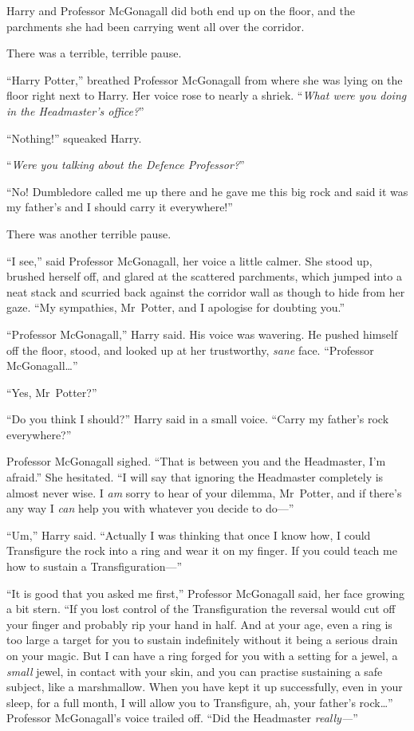 Harry and Professor McGonagall did both end up on the floor, and the parchments she had been carrying went all over the corridor.

There was a terrible, terrible pause.

“Harry Potter,” breathed Professor McGonagall from where she was lying on the floor right next to Harry. Her voice rose to nearly a shriek. “\emph{What were you doing in the Headmaster’s office?}”

“Nothing!” squeaked Harry.

“\emph{Were you talking about the Defence Professor?}”

“No! Dumbledore called me up there and he gave me this big rock and said it was my father’s and I should carry it everywhere!”

There was another terrible pause.

“I see,” said Professor McGonagall, her voice a little calmer. She stood up, brushed herself off, and glared at the scattered parchments, which jumped into a neat stack and scurried back against the corridor wall as though to hide from her gaze.
“My sympathies, Mr~Potter, and I apologise for doubting you.”

“Professor McGonagall,” Harry said. His voice was wavering. He pushed himself off the floor, stood, and looked up at her trustworthy, \emph{sane} face.
“Professor McGonagall…”

“Yes, Mr~Potter?”

“Do you think I should?” Harry said in a small voice.
“Carry my father’s rock everywhere?”

Professor McGonagall sighed.
“That is between you and the Headmaster, I’m afraid.” She hesitated.
“I will say that ignoring the Headmaster completely is almost never wise. I \emph{am} sorry to hear of your dilemma, Mr~Potter, and if there’s any way I \emph{can} help you with whatever you decide to do—”

“Um,” Harry said.
“Actually I was thinking that once I know how, I could Transfigure the rock into a ring and wear it on my finger. If you could teach me how to sustain a Transfiguration—”

“It is good that you asked me first,” Professor McGonagall said, her face growing a bit stern.
“If you lost control of the Transfiguration the reversal would cut off your finger and probably rip your hand in half. And at your age, even a ring is too large a target for you to sustain indefinitely without it being a serious drain on your magic. But I can have a ring forged for you with a setting for a jewel, a \emph{small} jewel, in contact with your skin, and you can practise sustaining a safe subject, like a marshmallow. When you have kept it up successfully, even in your sleep, for a full month, I will allow you to Transfigure, ah, your father’s rock…” Professor McGonagall’s voice trailed off.
“Did the Headmaster \emph{really—}”

